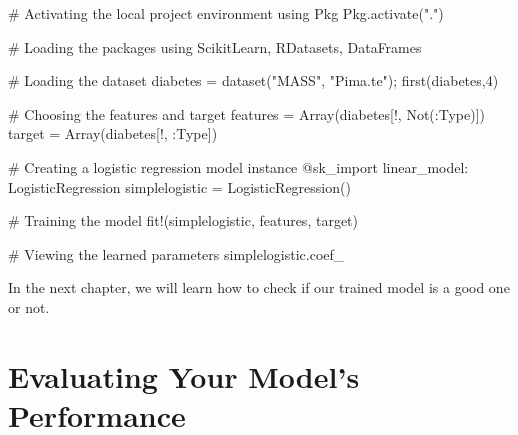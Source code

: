 \documentclass[
  letterpaper,
]{book}
\newenvironment{Shaded}{\begin{snugshade}}{\end{snugshade}}
\newcommand{\BuiltInTok}[1]{\textcolor[rgb]{0.00,0.23,0.31}{#1}}
\newcommand{\CommentTok}[1]{\textcolor[rgb]{0.37,0.37,0.37}{#1}}
\newcommand{\DataTypeTok}[1]{\textcolor[rgb]{0.68,0.00,0.00}{#1}}
\newcommand{\FloatTok}[1]{\textcolor[rgb]{0.68,0.00,0.00}{#1}}
\newcommand{\FunctionTok}[1]{\textcolor[rgb]{0.28,0.35,0.67}{#1}}
\newcommand{\ImportTok}[1]{\textcolor[rgb]{0.00,0.46,0.62}{#1}}
\newcommand{\NormalTok}[1]{\textcolor[rgb]{0.00,0.23,0.31}{#1}}
\newcommand{\OperatorTok}[1]{\textcolor[rgb]{0.37,0.37,0.37}{#1}}
\newcommand{\PreprocessorTok}[1]{\textcolor[rgb]{0.68,0.00,0.00}{#1}}
\newcommand{\StringTok}[1]{\textcolor[rgb]{0.13,0.47,0.30}{#1}}
\begin{document}
\begin{Shaded}
\begin{Highlighting}[]
\CommentTok{\# Activating the local project environment }
\ImportTok{using} \BuiltInTok{Pkg}
\BuiltInTok{Pkg}\NormalTok{.}\FunctionTok{activate}\NormalTok{(}\StringTok{"."}\NormalTok{)}

\CommentTok{\# Loading the packages }
\ImportTok{using} \BuiltInTok{ScikitLearn}\NormalTok{, }\BuiltInTok{RDatasets}\NormalTok{, }\BuiltInTok{DataFrames}

\CommentTok{\# Loading the dataset}
\NormalTok{diabetes }\OperatorTok{=} \FunctionTok{dataset}\NormalTok{(}\StringTok{"MASS"}\NormalTok{, }\StringTok{"Pima.te"}\NormalTok{);}
\FunctionTok{first}\NormalTok{(diabetes,}\FloatTok{4}\NormalTok{)}

\CommentTok{\# Choosing the features and target}
\NormalTok{features }\OperatorTok{=} \FunctionTok{Array}\NormalTok{(diabetes[!, }\FunctionTok{Not}\NormalTok{(}\OperatorTok{:}\DataTypeTok{Type}\NormalTok{)])}
\NormalTok{target }\OperatorTok{=} \FunctionTok{Array}\NormalTok{(diabetes[!, }\OperatorTok{:}\DataTypeTok{Type}\NormalTok{])}

\CommentTok{\# Creating a logistic regression model instance }
\PreprocessorTok{@sk\_import}\NormalTok{ linear\_model}\OperatorTok{:}\NormalTok{ LogisticRegression}
\NormalTok{simplelogistic }\OperatorTok{=} \FunctionTok{LogisticRegression}\NormalTok{()}

\CommentTok{\# Training the model }
\FunctionTok{fit!}\NormalTok{(simplelogistic, features, target)}

\CommentTok{\# Viewing the learned parameters }
\NormalTok{simplelogistic.coef\_}
\end{Highlighting}
\end{Shaded}

In the next chapter, we will learn how to check if our trained model is
a good one or not.

\hypertarget{evaluating-your-models-performance}{%
\chapter{Evaluating Your Model's
Performance}\label{evaluating-your-models-performance}}
\end{document}
